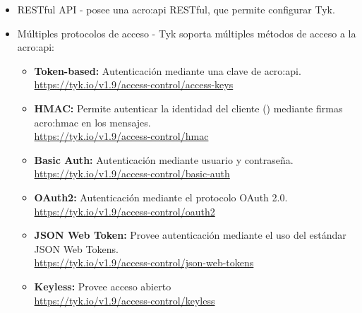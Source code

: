 \begin{itemize}
  \item RESTful API - posee una \gls{acro:api} RESTful, que permite configurar Tyk.
  \item Múltiples protocolos de acceso - Tyk soporta múltiples métodos de acceso a la \gls{acro:api}:
  \begin{itemize}
    \item \textbf{Token-based:} Autenticación mediante una clave de \gls{acro:api}. \\
    \url{https://tyk.io/v1.9/access-control/access-keys}
    \item \textbf{HMAC:} Permite autenticar la identidad del cliente () mediante firmas \gls{acro:hmac} en los mensajes. \\
    \url{https://tyk.io/v1.9/access-control/hmac}
    \item \textbf{Basic Auth:} Autenticación mediante usuario y contraseña. \\
    \url{https://tyk.io/v1.9/access-control/basic-auth}
    \item \textbf{OAuth2:} Autenticación mediante el protocolo OAuth 2.0. \\
    \url{https://tyk.io/v1.9/access-control/oauth2}
    \item \textbf{JSON Web Token:} Provee autenticación mediante el uso del estándar JSON Web Tokens. \\
    \url{https://tyk.io/v1.9/access-control/json-web-tokens}
    \item \textbf{Keyless:} Provee acceso abierto \\
    \url{https://tyk.io/v1.9/access-control/keyless}
  \end{itemize}


\end{itemize}
